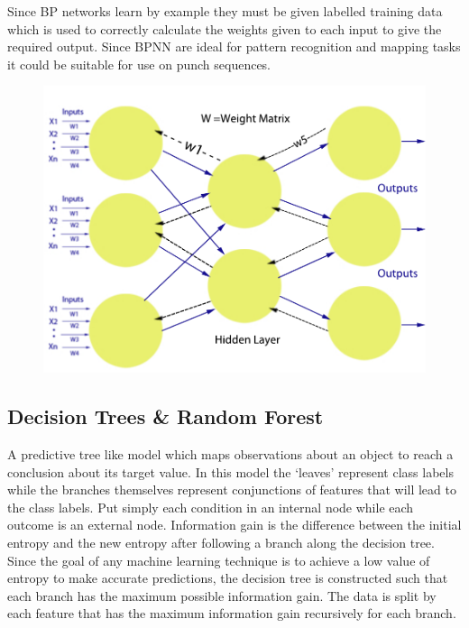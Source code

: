 Since BP networks learn by example they must be given labelled training data which is used to correctly calculate the weights given to each input to give the required output. Since BPNN are ideal for pattern recognition and mapping tasks it could be suitable for use on punch sequences.

\begin{figure}[h]
    \centering
    \includegraphics[height=0.25\textheight]{fig02/nn.pdf}
    \label{fig:kinect}
\end{figure}


\subsection{Decision Trees \& Random Forest}
A predictive tree like model which maps observations about an object to reach a conclusion about its target value. In this model the `leaves' represent class labels while the branches themselves represent conjunctions of features that will lead to the class labels. Put simply each condition in an internal node while each outcome is an external node. Information gain is the difference between the initial entropy and the new entropy after following a branch along the decision tree. Since the goal of any machine learning technique is to achieve a low value of entropy to make accurate predictions, the decision tree is constructed such that each branch has the maximum possible information gain. The data is split by each feature that has the maximum information gain recursively for each branch.

